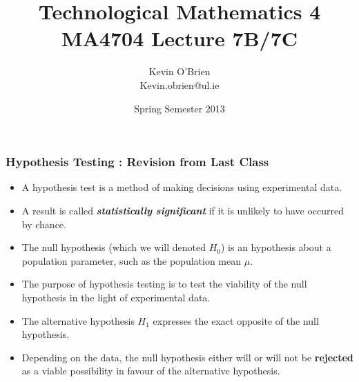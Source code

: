 ﻿\documentclass[a4]{beamer}
\title[MA4704]{Technological Mathematics 4 \\ {\normalsize MA4704 Lecture 7B/7C}}
\author[Kevin O'Brien]{Kevin O'Brien \\ {\scriptsize Kevin.obrien@ul.ie}}
\date{Spring Semester 2013}
\institute[Maths \& Stats]{Dept. of Mathematics \& Statistics, \\ University \textit{of} Limerick}
\begin{document}
\begin{frame}
\titlepage
\end{frame}




\begin{frame}
\frametitle{Hypothesis Testing : Revision from Last Class}
\large
\begin{itemize} \item
A hypothesis test is a method of making decisions using experimental data. \item A result is called \textbf{\emph{statistically significant}} if it is unlikely to have occurred by chance.





\item The null hypothesis (which we will denoted $H_0$) is an hypothesis about a population parameter, such as the population mean $\mu$. \item The purpose of hypothesis testing is to test the viability of the null hypothesis in the light of experimental data. \item The alternative hypothesis $H_1$ expresses the exact opposite of the null hypothesis. \item Depending on the data, the null hypothesis either will or will not be \textbf{rejected} as a viable possibility in favour of the alternative hypothesis.
\end{itemize}

\end{frame}
\end{document}
